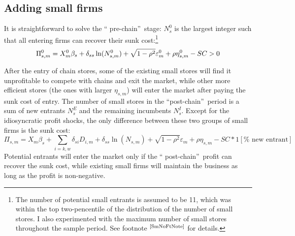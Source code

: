 \documentclass[notitlepage,onecolumn,11pt]{article}
\begin{document}
\subsection{Adding small firms\label{SmallCom}}

It is straightforward to solve the \textquotedblleft
pre-chain\textquotedblright\ stage: $N_{s}^{0}$ is the largest integer such
that all entering firms can recover their sunk cost:\footnote{%
The number of potential small entrants is assumed to be 11, which was within
the top two-pencentile of the distribution of the number of small stores. I
also experimented with the maximum number of small stores throughout the
sample period. See footnote $^{\text{\ref{SmNoFtNote}}}$ for details.}%
\begin{equation*}
\Pi _{s,m}^{0}=X_{m}^{0}\beta _{s}+\delta _{ss}\ln (N_{s,m}^{0})+\sqrt{%
1-\rho ^{2}}\varepsilon _{m}^{0}+\rho \eta _{s,m}^{0}-SC>0
\end{equation*}

After the entry of chain stores, some of the existing small stores will find
it unprofitable to compete with chains and exit the market, while other more
efficient stores (the ones with larger $\eta _{s,m}$) will enter the market
after paying the sunk cost of entry. The number of small stores in the
\textquotedblleft post-chain\textquotedblright\ period is a sum of new
entrants $N_{s}^{E}$ and the remaining incumbents $N_{s}^{I}$. Except for
the idiosyncratic profit shocks, the only difference between these two
groups of small firms is the sunk cost: 
\begin{equation*}
\Pi _{s,m}=X_{m}\beta _{s}+\sum_{i=k,w}\delta _{si}D_{i,m}+\delta _{ss}\ln
(N_{s,m})+\sqrt{1-\rho ^{2}}\varepsilon _{m}+\rho \eta _{s,m}-SC\ast 1[\text{%
new entrant}]
\end{equation*}%
Potential entrants will enter the market only if the \textquotedblleft
post-chain\textquotedblright\ profit can recover the sunk cost, while
existing small firms will maintain the business as long as the profit is
non-negative.
\end{document}
